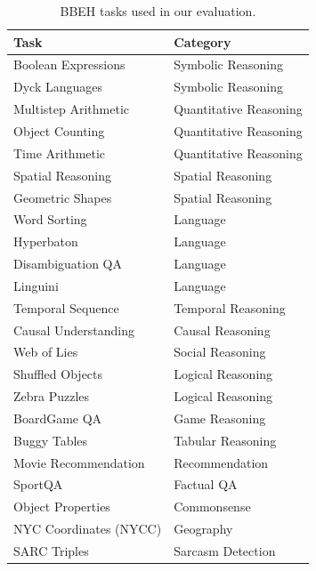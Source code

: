 \begin{table}[h]
\caption{BBEH tasks used in our evaluation.}
\label{tab:bbeh_tasks}
\vskip 0.15in
\begin{center}
\begin{small}
\begin{sc}
\begin{tabular}{ll}
\toprule
\textbf{Task} & \textbf{Category} \\
\midrule
Boolean Expressions    & Symbolic Reasoning \\
Dyck Languages         & Symbolic Reasoning \\
Multistep Arithmetic   & Quantitative Reasoning \\
Object Counting        & Quantitative Reasoning \\
Time Arithmetic        & Quantitative Reasoning \\
Spatial Reasoning      & Spatial Reasoning \\
Geometric Shapes       & Spatial Reasoning \\
Word Sorting           & Language \\
Hyperbaton             & Language \\
Disambiguation QA      & Language \\
Linguini               & Language \\
Temporal Sequence      & Temporal Reasoning \\
Causal Understanding   & Causal Reasoning \\
Web of Lies            & Social Reasoning \\
Shuffled Objects       & Logical Reasoning \\
Zebra Puzzles          & Logical Reasoning \\
BoardGame QA           & Game Reasoning \\
Buggy Tables           & Tabular Reasoning \\
Movie Recommendation   & Recommendation \\
SportQA                & Factual QA \\
Object Properties      & Commonsense \\
NYC Coordinates (NYCC) & Geography \\
SARC Triples           & Sarcasm Detection \\
\bottomrule
\end{tabular}
\end{sc}
\end{small}
\end{center}
\vskip -0.1in
\end{table}